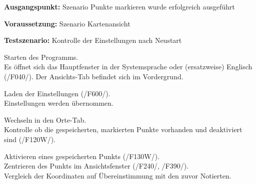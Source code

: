 \documentclass[10pt]{scrreprt}
\newcommand{\sfbf}[1]{\textbf{\sffamily #1}}
\newcommand{\ziel}[1]{{\fontsize{9.5}{11}\textsf{/#1/}}}
\newenvironment{details}[1][6pt]{%
  \parskip#1 \parindent6mm \raggedright%
  \def\item{\par\ignorespaces\hangindent=5mm \hangafter1}}{%
  \par\ignorespaces}
\begin{document}
\vspace{1.0cm}
\begin{details}[2pt]
\item \sfbf{Ausgangspunkt:} Szenario Punkte markieren wurde erfolgreich ausgeführt
\item \sfbf{Voraussetzung:} Szenario Kartenansicht
\item \sfbf{Testszenario:} Kontrolle der Einstellungen nach Neustart
\end{details}
\vspace{2mm}
\begin{enumerate}[leftmargin = 2.2cm, resume]
\item Starten des Programms.\\Es öffnet sich das Hauptfenster in der Systemsprache oder (ersatzweise) Englisch (\ziel{F040}). Der Ansichts-Tab befindet sich im Vordergrund.
\item Laden der Einstellungen (\ziel{F600}).\\Einstellungen werden übernommen.
\item Wechseln in den Orte-Tab.\\Kontrolle ob die gespeicherten, markierten Punkte vorhanden und deaktiviert sind (\ziel{F120W}).
\item Aktivieren eines gespeicherten Punkts (\ziel{F130W}).\\Zentrieren des Punkts im Ansichtsfenster (\ziel{F240}, \ziel{F390}).\\Vergleich der Koordinaten auf Übereinstimmung mit den zuvor Notierten.
\end{enumerate}
\end{document}
